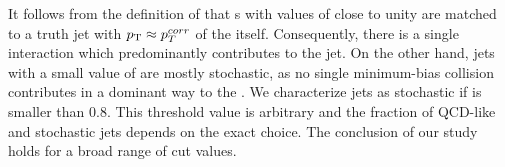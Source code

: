 It follows from the definition of \Rpt{} that \pujet s with values of \Rpt{} close to unity are matched to a truth jet with $p_{\mathrm{T}} \approx p_T^{corr}$ of the \pujet{} itself. Consequently, there is a single \MB{} interaction which predominantly contributes to the jet. On the other hand, jets with a small value of \Rpt{} are mostly stochastic, as no single minimum-bias collision contributes in a dominant way to the \pujet. We characterize jets as stochastic if \Rpt{} is smaller than 0.8. This threshold value is arbitrary and the fraction of QCD-like and stochastic jets depends on the exact choice. The conclusion of our study holds for a broad range of cut values.



